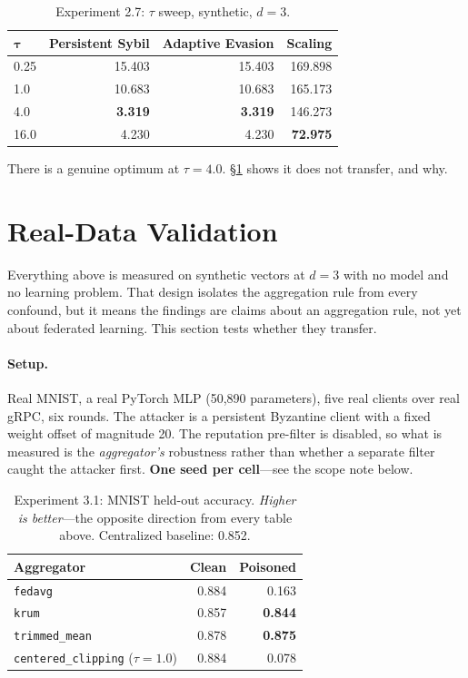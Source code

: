 \documentclass[11pt,a4paper]{article}
\newcommand{\code}[1]{\texttt{\small #1}}
\newcommand{\best}[1]{\textbf{#1}}
\newcommand{\bad}[1]{\textcolor{red!70!black}{#1}}
\begin{document}
\begin{table}[htbp]
\centering
\small
\caption{Experiment 2.7: $\tau$ sweep, synthetic, $d=3$.}
\label{tab:tau}
\begin{tabular}{lrrr}
\toprule
$\boldsymbol{\tau}$ & \textbf{Persistent Sybil} & \textbf{Adaptive Evasion} & \textbf{Scaling} \\
\midrule
0.25 & 15.403 & 15.403 & 169.898 \\
1.0  & 10.683 & 10.683 & 165.173 \\
4.0  & \best{3.319} & \best{3.319} & 146.273 \\
16.0 & 4.230 & 4.230 & \best{72.975} \\
\bottomrule
\end{tabular}
\end{table}

There is a genuine optimum at $\tau = 4.0$. \S\ref{sec:realdata} shows it
does not transfer, and why.

\section{Real-Data Validation}
\label{sec:realdata}

Everything above is measured on synthetic vectors at $d=3$ with no model
and no learning problem. That design isolates the aggregation rule from
every confound, but it means the findings are claims about an aggregation
rule, not yet about federated learning. This section tests whether they
transfer.

\paragraph{Setup.} Real MNIST, a real PyTorch MLP (50{,}890 parameters),
five real clients over real gRPC, six rounds. The attacker is a persistent
Byzantine client with a fixed weight offset of magnitude 20. The
reputation pre-filter is disabled, so what is measured is the
\emph{aggregator's} robustness rather than whether a separate filter
caught the attacker first. \textbf{One seed per cell}---see the scope note
below.

\begin{table}[htbp]
\centering
\small
\caption{Experiment 3.1: MNIST held-out accuracy. \emph{Higher is
better}---the opposite direction from every table above. Centralized
baseline: 0.852.}
\label{tab:mnist}
\begin{tabular}{lrr}
\toprule
\textbf{Aggregator} & \textbf{Clean} & \textbf{Poisoned} \\
\midrule
\code{fedavg}       & 0.884 & \bad{0.163} \\
\code{krum}         & 0.857 & \best{0.844} \\
\code{trimmed\_mean} & 0.878 & \best{0.875} \\
\code{centered\_clipping} ($\tau{=}1.0$) & 0.884 & \bad{0.078} \\
\bottomrule
\end{tabular}
\end{table}
\end{document}
